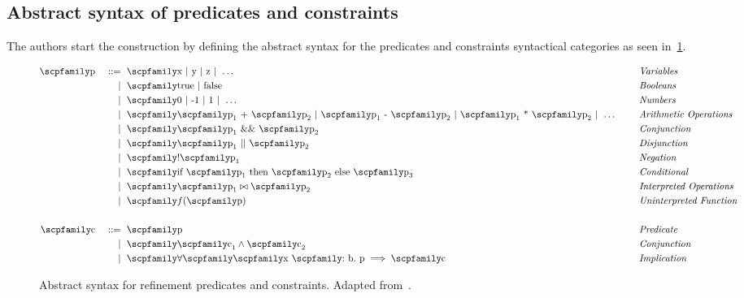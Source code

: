 \documentclass[
  oneside,
  english,
  coorientadorbanca,
  noabntexcite
]{ufsc-thesis-rn46-2019}
\def\bnfdef{::=}
\newcommand{\codett}[1]{\text{\scpfamily#1}}
\newcommand{\code}[1]{\text{\scpfamily\setlength\spaceskip{0.35em}#1}}
\newcommand{\bnfmore}[1]{            & \ & \mid{}    & \ \code{#1}}
\newcommand{\astprod}[2]{\code{#1} & \ & \bnfdef{} & \ \code{#2}}
\newcommand{\astmore}[1]{\bnfmore{#1}}
\newcommand{\typer}[2]{\code{#1 \codett{:} #2}}
\begin{document}
\subsection{Abstract syntax of predicates and constraints}

The authors start the construction by defining the abstract syntax for the predicates and constraints syntactical categories as seen in~\cref{fig:refinement_predicates}.
\begin{figure}[ht]
  \begin{minipage}{\textwidth}
    \begin{alignat*}{4}
      \astprod{p}{x $\mid$ y $\mid$ z $\mid\ \dots$} & \quad & \textit{Variables}              \\
      \astmore{true $\mid$ false}                    & \quad & \textit{Booleans}               \\
      \astmore{0 $\mid$ -1 $\mid$ 1 $\mid\ \dots$ }  & \quad & \textit{Numbers}                \\
      \astmore{%
        $\code{p}_1$ + $\code{p}_2$
        $\mid$ $\code{p}_1$ - $\code{p}_2$
        $\mid$ $\code{p}_1$ * $\code{p}_2$
        $\mid\ \dots$
      }                                              & \quad & \textit{Arithmetic Operations}  \\
      \astmore{$\code{p}_1$ \&\& $\code{p}_2$}       & \quad & \textit{Conjunction}            \\
      \astmore{$\code{p}_1$ || $\code{p}_2$}         & \quad & \textit{Disjunction}            \\
      \astmore{!$\code{p}_1$}                        & \quad & \textit{Negation}               \\
      \astmore{if $\code{p}_1$ then $\code{p}_2$ else $\code{p}_3$}
                                                     & \quad & \textit{Conditional}            \\
      \astmore{$\code{p}_1\bowtie\code{p}_2$}        & \quad & \textit{Interpreted Operations} \\
      \astmore{$f{(\code{p})}$}                      & \quad & \textit{Uninterpreted Function} \\
      \\
      \astprod{c}{p}                                 & \quad & \textit{Predicate}              \\
      \astmore{$\code{c}_1\land\code{c}_2$}          & \quad & \textit{Conjunction}            \\
      \astmore{$\forall\code{\typer{x}{b}.\ p}\implies\code{c}$ }
                                                     & \quad & \textit{Implication}            \\
    \end{alignat*}
  \end{minipage}
  \caption{
    Abstract syntax for refinement predicates and constraints.
    Adapted from~\cite{jhala2020tutorial}.
  }\label{fig:refinement_predicates}
\end{figure}
\end{document}
